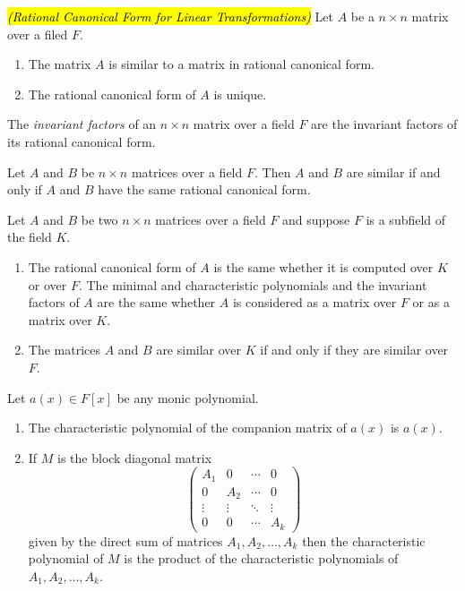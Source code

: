 \nl

\begin{thm}\hl{\textit{(Rational Canonical Form for Linear Transformations)}}
Let $A$ be a $n\times n$ matrix over a filed $F$.
\begin{enumerate}
\item The matrix $A$ is similar to a matrix in rational canonical form.
\item The rational canonical form of $A$ is unique.
\end{enumerate}
\end{thm}

\nl

\begin{defn}
The \textit{invariant factors} of an $n\times n$ matrix over a field $F$ are the invariant factors of its rational canonical form.
\end{defn}

\nl

\begin{thm}
Let $A$ and $B$ be $n\times n$ matrices over a field $F$. Then $A$ and $B$ are similar if and only if $A$ and $B$ have the same rational canonical form.
\end{thm}

\nl

\begin{cor}
Let $A$ and $B$ be two $n\times n$ matrices over a field $F$ and suppose $F$ is a subfield of the field $K$.
\begin{enumerate}
\item The rational canonical form of $A$ is the same whether it is computed over $K$ or over $F$. The minimal and characteristic polynomials and the invariant factors of $A$ are the same whether $A$ is considered as a matrix over $F$ or as a matrix over $K$.
\item The matrices $A$ and $B$ are similar over $K$ if and only if they are similar over $F$.
\end{enumerate}
\end{cor}

\nl

\begin{lem}
Let $a(x)\in F[x]$ be any monic polynomial.
\begin{enumerate}
\item The characteristic polynomial of the companion matrix of $a(x)$ is $a(x)$.
\item If $M$ is the block diagonal matrix
\[\begin{pmatrix}
A_1 & 0 & \cdots & 0\\
0 & A_2 & \cdots & 0\\
\vdots & \vdots & \ddots & \vdots\\
0 & 0 & \cdots & A_k
\end{pmatrix}\]
given by the direct sum of matrices $A_1, A_2, \ldots, A_k$ then the characteristic polynomial of $M$ is the product of the characteristic polynomials of $A_1, A_2, \ldots, A_k$.
\end{enumerate}
\end{lem}

